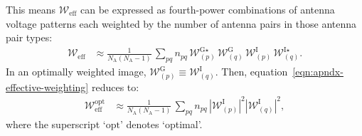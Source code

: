 \documentclass[a4paper,fleqn,usenatbib]{mnras}
\newcommand{\Nant}{N_\textrm{A}}
\begin{document}
This means $\mathcal{W}_\textrm{eff}$ can be expressed as fourth-power combinations of antenna voltage patterns each weighted by the number of antenna pairs in those antenna pair types:
\begin{align}
  \mathcal{W}_\textrm{eff} &\approx \frac{1}{\Nant(\Nant-1)}\,\sum_{pq}n_{pq}\,\mathcal{W}^{\textrm{G}\star}_{(p)}\,\mathcal{W}^\textrm{G}_{(q)}\,\mathcal{W}^\textrm{I}_{(p)}\,\mathcal{W}^{\textrm{I}\star}_{(q)}.
\end{align}
In an optimally weighted image, $\mathcal{W}^\textrm{G}_{(p)} \equiv \mathcal{W}^\textrm{I}_{(q)}$. Then, equation~\ref{eqn:apndx-effective-weighting} reduces to:
\begin{align}\label{eqn:apndx-effective-weighting-optimal}
  \mathcal{W}_\textrm{eff}^\textrm{opt} &\approx \frac{1}{\Nant(\Nant-1)}\,\sum_{pq} n_{pq}\,\left|\mathcal{W}^\textrm{I}_{(p)}\right|^2\left|\mathcal{W}^\textrm{I}_{(q)}\right|^2,
\end{align}
where the superscript `$\textrm{opt}$' denotes `optimal'.





\bsp	%
\label{lastpage}
\end{document}
